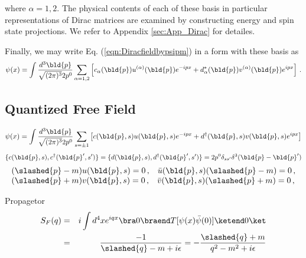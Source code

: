 where $\alpha = 1, 2$.
The physical contents of each of these basis 
in particular representations of Dirac matrices
are examined by
constructing energy and spin state projections.
We refer to Appendix \ref{sec:App_Dirac} for detailes.

Finally, we may write Eq. (\ref{eqn:Diracfieldbypsipm})  in a form with these basis as
\begin{eqnarray}
\psi(x) = \int \frac{d^3 \bld{p}}{\sqrt{(2\pi)^3} 2 p^0}
\sum_{\alpha = 1, 2} \left[
c_\alpha(\bld{p}) u^{(\alpha)}(\bld{p}) e^{-ipx} + d_\alpha^*(\bld{p}) v^{(\alpha)}(\bld{p}) e^{ipx}
\right] \,.
\end{eqnarray}

\newpage 
\subsection{Quantized Free Field}
\begin{equation}
\psi(x) 
=
\int \frac{d^3 \bld{p}}{\sqrt{(2\pi)^3} 2 p^0}
\sum_{s = \pm 1}
\left[
c(\bld{p}, s) u(\bld{p}, s) e^{-ipx}
+
d^\dagger(\bld{p}, s) v(\bld{p}, s) e^{ipx}
\right]
\end{equation}
\begin{equation}
\{ c(\bld{p}, s), c^\dagger(\bld{p}', s') \}
=
\{ d(\bld{p}, s), d^\dagger(\bld{p}', s') \}
=
2p^0 \delta_{ss'}
\delta^3(\bld{p} - \bld{p}')
\end{equation}
\begin{equation}
\begin{array}{l}
(\slashed{p} - m) u(\bld{p}, s) = 0\,,
\hspace{3mm}
\bar{u}(\bld{p}, s)(\slashed{p} - m)  = 0\,,
\\
(\slashed{p} + m) v(\bld{p}, s) = 0\,,
\hspace{3mm}
\bar{v}(\bld{p}, s)(\slashed{p} + m)  = 0\,,
\end{array}
\end{equation}

Propagetor
\begin{eqnarray}
S_F(q) &=& i \int d^4x e^{iqx}
\bra 0 \braend T[\psi(x) \bar{\psi}(0)]
\ketend 0 \ket
\nonumber\\
&=&
\frac{-1}{\slashed{q} - m + i \epsilon}
=
- \frac{\slashed{q} + m}{ q^2 - m^2 + i \epsilon}
\label{eqn:DiracPropagator}
\end{eqnarray}

